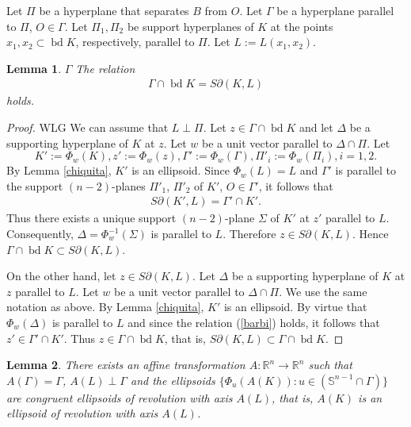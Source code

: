 \documentclass[12pt]{amsart}
\newcommand{\bd}{\operatorname*{bd}}
\newcommand{\Rn}{\mathbb{R}^{n}}
\newtheorem{lemma}{Lemma}
\begin{document}
                   Let $\Pi$ be a hyperplane that separates $B$ from $O$. Let $\Gamma$ be a 
                   hyperplane parallel to $\Pi$, $O\in \Gamma$. Let $\Pi_1,\Pi_2$ be support hyperplanes 
                   of $K$ at the points $x_1,x_2\subset \bd K$, respectively, parallel to $\Pi$. Let 
                   $L:=L(x_1, x_2)$.
\begin{lemma}\label{u2}
$\Gamma$ The relation
\begin{eqnarray}\label{jacki}
\Gamma \cap \bd K=S\partial(K,L)
\end{eqnarray}
holds.
 \end{lemma}
\begin{proof}
                    WLG We can assume that $L\perp \Pi$. Let $z\in \Gamma \cap \bd K$ and let $\Delta$ 
                    be a supporting hyperplane of $K$ at $z$. Let $w$ be a unit vector parallel to 
                    $\Delta \cap \Pi$. Let 
\[
  K':=\Phi_w(K), z':=\Phi_w(z), \Gamma':=\Phi_w(\Gamma), \Pi'_i:=\Phi_w(\Pi_i), i=1,2.
\]  
                    By Lemma \ref{chiquita}, $K'$ is an ellipsoid. Since $\Phi_w(L)=L$ and $\Gamma'$ is 
                    parallel to the support $(n-2)$-planes $\Pi'_1$, $\Pi'_2$ of $K'$,   $O\in \Gamma'$, it 
                    follows that
\begin{eqnarray}\label{barbi}
S\partial (K',L)= \Gamma' \cap K'.    
\end{eqnarray}
                    Thus there exists a unique support $(n-2)$-plane $\Sigma$ of $K'$ at $z'$ parallel to 
                    $L$. Consequently, $\Delta=\Phi_{w}^{-1}(\Sigma)$ is parallel to $L$. Therefore 
                    $z\in S\partial (K,L)$. Hence $\Gamma \cap \bd K \subset S\partial (K,L)$.

                    On the other hand, let $z\in S\partial (K,L)$. Let $\Delta$ be a supporting hyperplane 
                    of $K$ at $z$ parallel to $L$. Let $w$ be a unit vector parallel to $\Delta \cap \Pi$. 
                    We use the same notation as above. By Lemma \ref{chiquita}, $K'$ is an ellipsoid. 
                    By virtue that $\Phi_w(\Delta)$ is parallel to $L$ and since the relation (\ref{barbi}) 
                    holds, it follows that $z'\in \Gamma'\cap K'$. Thus $z\in \Gamma \cap \bd K$, that is, 
                    $S\partial (K,L)\subset \Gamma \cap \bd K$.
\end{proof}
\begin{lemma}\label{teta}
                    There exists an affine transformation $A:\Rn \rightarrow \Rn$ such that 
                    $A(\Gamma)=\Gamma$, $A(L)\perp \Gamma$ and the ellipsoids 
                    $\{\Phi_u(A(K)): u\in (\mathbb{S}^{n-1}\cap \Gamma) \}$ are 
                    congruent ellipsoids of revolution with axis $A(L)$, that is, $A(K)$ is an ellipsoid of 
                    revolution with axis $A(L)$. 
\end{lemma}
\end{document}
